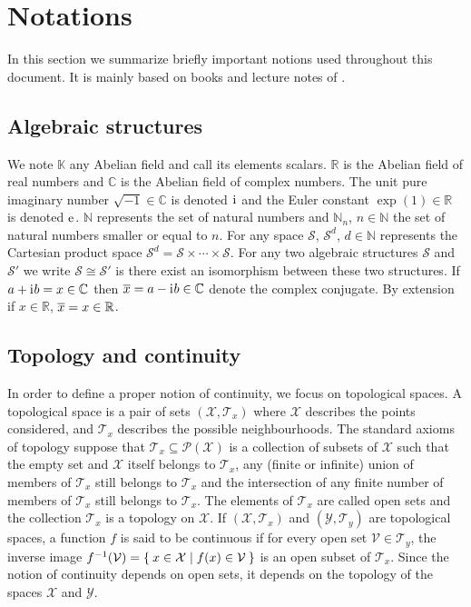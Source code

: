 
\section{Notations}
In this section we summarize briefly important notions used throughout this
document. It is mainly based on books and lecture notes of
\citet{kurdila2006convex,cotaescu2016elements}.

\subsection{Algebraic structures}
\label{sec:notations}
We note $\mathbb{K}$ any Abelian field and call its elements
scalars. $\mathbb{R}$ is the Abelian field of real numbers and $\mathbb{C}$ is
the Abelian field of complex numbers. The unit pure imaginary number
$\sqrt{-1}\in\mathbb{C}$ is denoted ${\mathrm{i}\mkern1mu}$ and the Euler constant
$\exp(1)\in\mathbb{R}$ is denoted $\mathrm{e}\mkern1mu$.  $\mathbb{N}$ represents the set of
natural numbers and $\mathbb{N}_n$, $n\in\mathbb{N}$ the set of natural numbers
smaller or equal to $n$. For any space $\mathcal{S}$, $\mathcal{S}^d$,
$d\in\mathbb{N}$ represents the Cartesian product space $\mathcal{S}^d =
\mathcal{S}\times\cdots\times\mathcal{S}$. For any two algebraic structures
$\mathcal{S}$ and $\mathcal{S}'$ we write $\mathcal{S}\cong\mathcal{S}'$ is
there exist an isomorphism between these two structures. If $a+{\mathrm{i}\mkern1mu} b = x \in
\mathbb{C}$ then $\overline{x}=a-{\mathrm{i}\mkern1mu} b\in\mathbb{C}$ denote the complex conjugate.
By extension if $x\in\mathbb{R}$, $\overline{x}=x\in\mathbb{R}$.

\subsection{Topology and continuity}
In order to define a proper notion of continuity, we focus on topological
spaces. A topological space is a pair of sets $(\mathcal{X},\mathcal{T}_x)$
where $\mathcal{X}$ describes the points considered, and $\mathcal{T}_x$
describes the possible neighbourhoods. The standard axioms of topology suppose
that $\mathcal{T}_x\subseteq{\mathcal{P}(\mathcal{X})}$ is a collection of
subsets of $\mathcal{X}$ such that the empty set and $\mathcal{X}$ itself
belongs to $\mathcal{T}_x$, any (finite or infinite) union of members of
$\mathcal{T}_x$ still belongs to $\mathcal{T}_x$ and the intersection of any
finite number of members of $\mathcal{T}_x$ still belongs to $\mathcal{T}_x$.
The elements of $\mathcal{T}_x$ are called open sets and the collection
$\mathcal{T}_x$ is a topology on $\mathcal{X}$. If
$(\mathcal{X},\mathcal{T}_x)$ and $(\mathcal{Y},\mathcal{T}_y)$ are topological
spaces, a function $f$ is said to be continuous if for every open set
$\mathcal{V}\in \mathcal{T}_y$, the inverse image $f^{-1}(\mathcal{V}) = \Set{
x \in \mathcal{X} | f ( x ) \in \mathcal{V} }$ is an open subset of
$\mathcal{T}_x$. Since the notion of continuity depends on open sets, it
depends on the topology of the spaces $\mathcal{X}$ and $\mathcal{Y}$.
